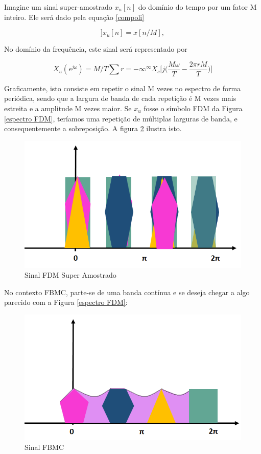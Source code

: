 \par Imagine um sinal super-amostrado $x_{u}[n]$ do domínio do tempo por um fator M inteiro. Ele será dado pela equação \ref{compoli}

\begin{equation}]\label{compoli}
x_{u}[n] = x[n/M],
\end{equation}

No domínio da frequência, este sinal será representado por

\begin{equation}
X_{u}(e^{j\omega}) = M/T\sum{r=-\infty}^{\infty}X_{c}\bigg[j\bigg(\frac{M\omega}{T}-\frac{2\pi rM}{T}\bigg)\bigg]
\end{equation}

Graficamente, isto consiste em repetir o sinal M vezes no espectro de forma periódica, sendo que a largura de banda de cada repetição é M vezes mais estreita e a amplitude M vezes maior. Se $x_{u}$ fosse o símbolo FDM da Figura \ref{espectro FDM}, teríamos uma repetição de múltiplas larguras de banda, e consequentemente a sobreposição. A figura \ref{espectro super FDM} ilustra isto. 

\begin{figure}[h!]
\centering
\includegraphics[width=4.5in]{Super_Amostrado_1.png}
\caption{Sinal FDM Super Amostrado}
\label{espectro super FDM}
\end{figure}

\par No contexto FBMC, parte-se de uma banda contínua e se deseja chegar a algo parecido com a Figura \ref{espectro FDM}: 

\begin{figure}[h!]
\centering
\includegraphics[width=4.5in]{Espetro_FBMC.png}
\caption{Sinal FBMC}
\label{espectro super FDM}
\end{figure}

